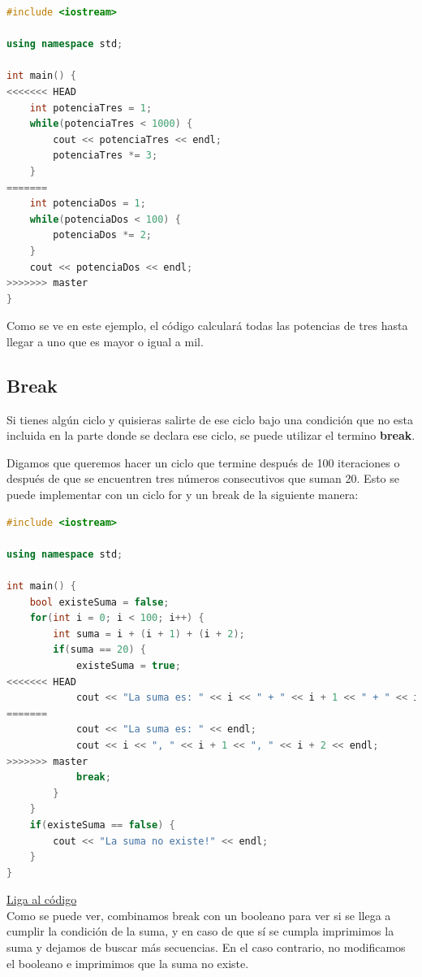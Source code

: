 \documentclass{article}
\begin{document}
\begin{lstlisting}[language=C++, title=Ciclo while]
#include <iostream>

using namespace std;

int main() {
<<<<<<< HEAD
	int potenciaTres = 1;
	while(potenciaTres < 1000) {
		cout << potenciaTres << endl;
		potenciaTres *= 3;
	}
=======
	int potenciaDos = 1;
	while(potenciaDos < 100) {
		potenciaDos *= 2;
	}
	cout << potenciaDos << endl;
>>>>>>> master
}
\end{lstlisting}

Como se ve en este ejemplo, el código calculará todas las potencias de tres hasta llegar a uno que es mayor o igual a mil.

\subsection{Break}

Si tienes algún ciclo y quisieras salirte de ese ciclo bajo una condición que no esta incluida en la parte donde se declara ese ciclo, se puede utilizar el termino \textbf{break}.

Digamos que queremos hacer un ciclo que termine después de 100 iteraciones o después de que se encuentren tres números consecutivos que suman 20. Esto se puede implementar con un ciclo for y un break de la siguiente manera:

\begin{lstlisting}[language=C++, title=Break]
#include <iostream>

using namespace std;

int main() {
	bool existeSuma = false;
	for(int i = 0; i < 100; i++) {
		int suma = i + (i + 1) + (i + 2);
		if(suma == 20) {
			existeSuma = true;
<<<<<<< HEAD
			cout << "La suma es: " << i << " + " << i + 1 << " + " << i + 2 << endl;
=======
			cout << "La suma es: " << endl;
			cout << i << ", " << i + 1 << ", " << i + 2 << endl;
>>>>>>> master
			break;
		}
	}
	if(existeSuma == false) {
		cout << "La suma no existe!" << endl;
	}
}
\end{lstlisting}
\href{https://repl.it/@Jamesscn/Suma-Triple}{Liga al código}\\

Como se puede ver, combinamos break con un booleano para ver si se llega a cumplir la condición de la suma, y en caso de que sí se cumpla imprimimos la suma y dejamos de buscar más secuencias. En el caso contrario, no modificamos el booleano e imprimimos que la suma no existe.
\end{document}
